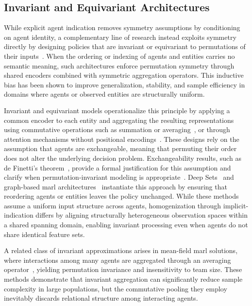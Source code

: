 \documentclass[]{jair}
\begin{document}
\subsection{Invariant and Equivariant Architectures}

While explicit agent indication removes symmetry assumptions by conditioning on agent identity,
a complementary line of research instead exploits symmetry directly by designing policies that are
invariant or equivariant to permutations of their inputs~\cite{zaheer2017, yang2018}.
When the ordering or indexing of agents and entities carries no semantic meaning,
such architectures enforce permutation symmetry through shared encoders combined with
symmetric aggregation operators.
This inductive bias has been shown to improve generalization, stability, and sample efficiency
in domains where agents or observed entities are structurally uniform.

Invariant and equivariant models operationalize this principle by applying a common encoder
to each entity and aggregating the resulting representations using commutative operations
such as summation or averaging~\cite{yang2018, li2021b}, or through attention mechanisms
without positional encodings~\cite{tang2021, zambaldi2018}.
These designs rely on the assumption that agents are exchangeable, meaning that permuting
their order does not alter the underlying decision problem.
Exchangeability results, such as de Finetti's theorem~\cite{diaconis1980},
provide a formal justification for this assumption and clarify when permutation-invariant
modeling is appropriate~\cite{alvarez-melis2015, zaheer2017}.
Deep Sets~\cite{zaheer2017} and graph-based \gls{marl} architectures~\cite{yang2021a} instantiate 
this approach by ensuring that reordering agents or entities leaves the policy unchanged.
While these methods assume a uniform input structure across agents,
homogenization through implicit-indication differs by aligning structurally 
heterogeneous observation spaces within a shared spanning domain, enabling invariant 
processing even when agents do not share identical feature sets.

A related class of invariant approximations arises in mean-field 
\gls{marl} solutions, where interactions among many agents are 
aggregated through an averaging operator~\cite{yang2018, li2021b}, 
yielding permutation invariance and insensitivity to team size. 
These methods demonstrate that invariant aggregation can 
significantly reduce sample complexity in large populations, 
but the commutative pooling they employ inevitably discards 
relational structure among interacting agents.
\end{document}
